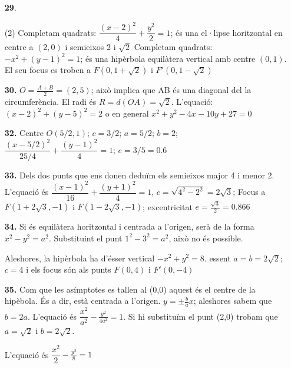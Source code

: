 \documentclass[a4paper, pdf, twoside]{book}
\begin{document}
\begin{multicols}{2}
\begin{enumerate}

 \item[\fontfamily{phv}\selectfont\color{blue}\textbf{29}. ] 
 \begin{tasks}[column-sep=1em, item-indent=1.3333em](2)
	 \task* Completam quadrats: $\dfrac {(x-2)^2}{4}+\dfrac {y^2}{2}=1$; és una el·lipse horitzontal en centre a $(2,0)$ i semieixos 2 i $\sqrt {2}$
	 \task* Completam quadrats: $-x^2 + (y-1)^2 = 1$; és una hipèrbola equilàtera vertical amb centre $(0,1)$. El seu focus es troben a $F(0,1+\sqrt {2})$ i $F'(0,1-\sqrt {2})$ 
\end{tasks}
\vspace{0.25cm}
\item[\fontfamily{phv}\selectfont\color{blue}\textbf{30. }] 
$O=\frac {A+B}{2}=(2,5)$; això implica que AB és una diagonal del la circumferència. El radi és $R=d(OA)=\sqrt {2}$. L'equació: $(x-2)^2+(y-5)^2=2$ o en general $x^2+y^2-4x-10y+27=0$
\vspace{0.25cm}
\item[\fontfamily{phv}\selectfont\color{blue}\textbf{32. }] 
Centre $O(5/2,1)$; $c=3/2$; $a=5/2$; $b=2$; $\dfrac {(x-5/2)^2}{25/4}+\dfrac {(y-1)^2}{4}=1$; $e=3/5=0.6$
\vspace{0.25cm}
\item[\fontfamily{phv}\selectfont\color{blue}\textbf{33. }] 
Dels dos punts que ens donen deduïm els semieixos major 4 i menor 2. L'equació és $\dfrac {(x-1)^2}{16}+\dfrac {(y+1)^2}{4}=1$, $c=\sqrt {4^2-2^2}=2\sqrt {3}$; Focus a $F(1+2\sqrt {3},-1)$ i $F(1-2\sqrt {3},-1)$; excentricitat $e=\frac {\sqrt {3}}{2}=0.866$
\vspace{0.25cm}
\item[\fontfamily{phv}\selectfont\color{blue}\textbf{34. }] 
Si és equilàtera horitzontal i centrada a l'origen, serà de la forma $x^2-y^2=a^2$. Substituint el punt $1^2-3^2=a^2$, això no és possible.\par Aleshores, la hipèrbola ha d'ésser vertical $-x^2+y^2=8$. essent $a=b=2\sqrt {2}$; $c=4$ i els focus són als punts $F(0,4)$ i $F'(0,-4)$
\vspace{0.25cm}
\item[\fontfamily{phv}\selectfont\color{blue}\textbf{35. }] 
Com que les asímptotes es tallen al (0,0) aquest és el centre de la hipèbola. És a dir, està centrada a l'origen. $y=\pm \frac {b}{a}x$; aleshores sabem que $b=2a$. L'equació és $\dfrac {x^2}{a^2}-\frac {y^2}{4a^2}=1$. Si hi substituïm el punt (2,0) trobam que $a=\sqrt {2}$ i $b=2\sqrt {2}$.\par L'equació és $\dfrac {x^2}{2}-\frac {y^2}{8}=1$

\end{enumerate}
\end{multicols}
\end{document}
